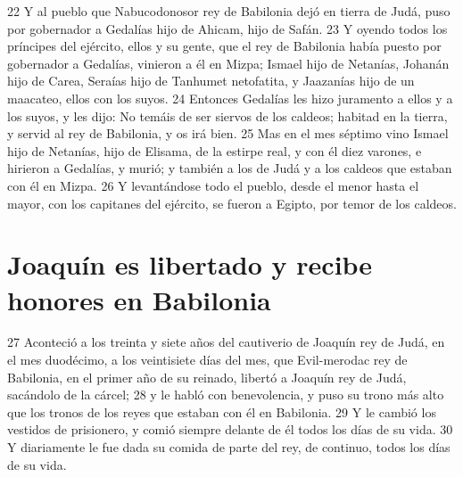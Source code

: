 22 Y al pueblo que Nabucodonosor rey de Babilonia dejó en tierra de Judá, puso por gobernador a Gedalías hijo de Ahicam, hijo de Safán.
23 Y oyendo todos los príncipes del ejército, ellos y su gente, que el rey de Babilonia había puesto por gobernador a Gedalías, vinieron a él en Mizpa; Ismael hijo de Netanías, Johanán hijo de Carea, Seraías hijo de Tanhumet netofatita, y Jaazanías hijo de un maacateo, ellos con los suyos.
24 Entonces Gedalías les hizo juramento a ellos y a los suyos, y les dijo: No temáis de ser siervos de los caldeos; habitad en la tierra, y servid al rey de Babilonia, y os irá bien. 
25 Mas en el mes séptimo vino Ismael hijo de Netanías, hijo de Elisama, de la estirpe real, y con él diez varones, e hirieron a Gedalías, y murió; y también a los de Judá y a los caldeos que estaban con él en Mizpa. 
26 Y levantándose todo el pueblo, desde el menor hasta el mayor, con los capitanes del ejército, se fueron a Egipto, por temor de los caldeos. 
\section*{Joaquín es libertado y recibe honores en Babilonia}

27 Aconteció a los treinta y siete años del cautiverio de Joaquín rey de Judá, en el mes duodécimo, a los veintisiete días del mes, que Evil-merodac rey de Babilonia, en el primer año de su reinado, libertó a Joaquín rey de Judá, sacándolo de la cárcel;
28 y le habló con benevolencia, y puso su trono más alto que los tronos de los reyes que estaban con él en Babilonia.
29 Y le cambió los vestidos de prisionero, y comió siempre delante de él todos los días de su vida.
30 Y diariamente le fue dada su comida de parte del rey, de continuo, todos los días de su vida.

